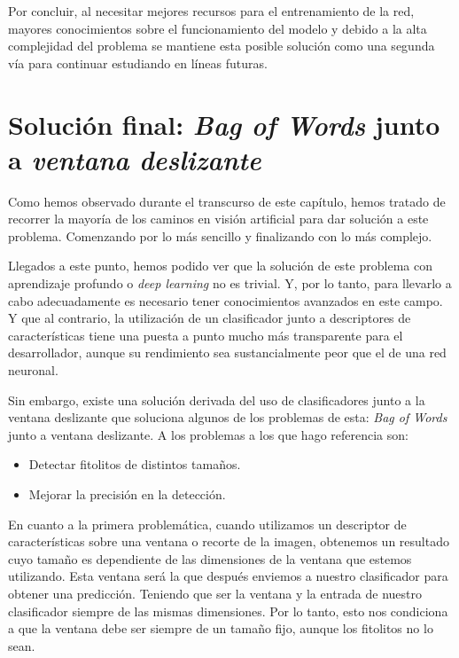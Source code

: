 Por concluir, al necesitar mejores recursos para el entrenamiento de la red, mayores conocimientos sobre el funcionamiento del modelo y debido a la alta complejidad del problema se mantiene esta posible solución como una segunda vía para continuar estudiando en líneas futuras.

\section{Solución final: \textit{Bag of Words} junto  a \textit{ventana deslizante}}

Como hemos observado durante el transcurso de este capítulo, hemos tratado de recorrer la mayoría de los caminos en visión artificial para dar solución a este problema. Comenzando por lo más sencillo y finalizando con lo más complejo.

Llegados a este punto, hemos podido ver que la solución de este problema con aprendizaje profundo o \textit{deep learning} no es trivial. Y, por lo tanto, para llevarlo a cabo adecuadamente es necesario tener conocimientos avanzados en este campo. Y que al contrario, la utilización de un clasificador junto a descriptores de características tiene una puesta a punto mucho más transparente para el desarrollador, aunque su rendimiento sea sustancialmente peor que el de una red neuronal.

Sin embargo, existe una solución derivada del uso de clasificadores junto a la ventana deslizante que soluciona algunos de los problemas de esta: \textit{Bag of Words} junto a ventana deslizante. A los problemas a los que hago referencia son:

\begin{itemize}
	\item Detectar fitolitos de distintos tamaños.
	\item Mejorar la precisión en la detección.
\end{itemize}

En cuanto a la primera problemática, cuando utilizamos un descriptor de características sobre una ventana o recorte de la imagen, obtenemos un resultado cuyo tamaño es dependiente de las dimensiones de la ventana que estemos utilizando. Esta ventana será la que después enviemos a nuestro clasificador para obtener una predicción. Teniendo que ser la ventana y la entrada de nuestro clasificador siempre de las mismas dimensiones. Por lo tanto, esto nos condiciona a que la ventana debe ser siempre de un tamaño fijo, aunque los fitolitos no lo sean.

